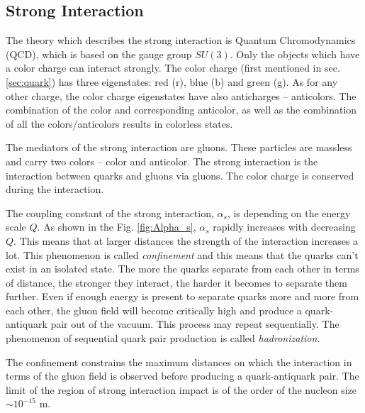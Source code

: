 \subsection{Strong Interaction}\label{sec:strong_int}

The theory which describes the strong interaction is Quantum Chromodynamics (QCD), which is based on the gauge group $SU(3)$. Only the
objects which have a color charge can interact strongly. The color charge (first mentioned in sec. \ref{sec:quark}) has three eigenstates:
red (r), blue (b) and green (g). As for any other charge, the color charge eigenstates have also anticharges -- anticolors. The combination
of the color and corresponding anticolor, as well as the combination of all the colors/anticolors results in colorless states.

The mediators of the strong interaction are gluons. These particles are massless and carry two colors -- color and anticolor. The strong 
interaction is the interaction between quarks and gluons via gluons. The color charge is conserved during the interaction.

The coupling constant of the strong interaction, $\alpha_{s}$, is depending on the energy scale $Q$. As shown in the
Fig. \ref{fig:Alpha_s}, $\alpha_{s}$ rapidly increases with decreasing $Q$. This means that at larger distances 
the strength of the interaction increases a lot. This phenomenon is called \textit{confinement} and this means that the quarks
can't exist in an isolated state. The more the quarks separate from each other in terms of distance, the stronger they interact, the harder
it becomes to separate them further. Even if enough energy is present to separate quarks more and more from each other, the gluon field will become critically
high and produce a quark-antiquark pair out of the vacuum. This process may repeat sequentially. 
The phenomenon of sequential quark pair production is called \textit{hadronization}.

The confinement constrains the maximum distances on which the interaction in terms of the gluon field is observed before producing a quark-antiquark pair.
The limit of the region of strong interaction impact is of the order of the nucleon size $\sim 10^{-15}$ m.

